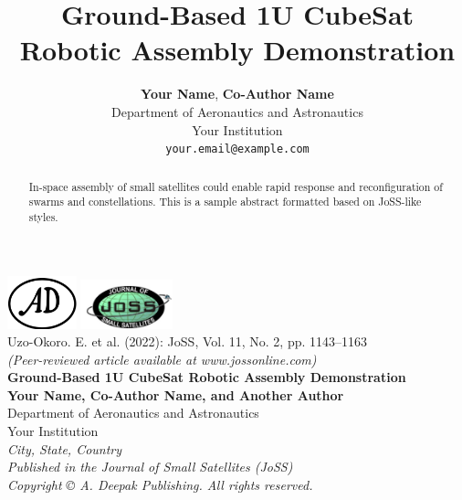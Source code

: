 \documentclass[11pt]{article}
\title{\textbf{Ground-Based 1U CubeSat Robotic Assembly Demonstration}}
\author{\textbf{Your Name}, \textbf{Co-Author Name} \\
Department of Aeronautics and Astronautics \\
Your Institution \\
\texttt{your.email@example.com}}
\date{}
\begin{document}
\begin{titlepage}
	\begin{center}
		\vspace*{-1cm}
		\includegraphics[width=0.15\textwidth]{example-logo-left.png}
		\hfill
		\includegraphics[width=0.2\textwidth]{example-logo-right.png} \\[0.5cm]
		
		\small
		Uzo-Okoro. E. et al. (2022): JoSS, Vol. 11, No. 2, pp. 1143--1163 \\[0.2cm]
		\textit{(Peer-reviewed article available at www.jossonline.com)} \\[1cm]
		
		{\Large \textbf{Ground-Based 1U CubeSat Robotic Assembly Demonstration}} \\[0.8cm]
		
		\textbf{Your Name, Co-Author Name, and Another Author} \\[0.3cm]
		Department of Aeronautics and Astronautics \\ 
		Your Institution \\
		\textit{City, State, Country} \\[1.5cm]
		
		\textit{Published in the Journal of Small Satellites (JoSS)} \\[0.2cm]
		\textit{Copyright © A. Deepak Publishing. All rights reserved.}
	\end{center}
\end{titlepage}


\begin{abstract}
In-space assembly of small satellites could enable rapid response and reconfiguration of swarms and constellations. This is a sample abstract formatted based on JoSS-like styles.
\end{abstract}
\end{document}
